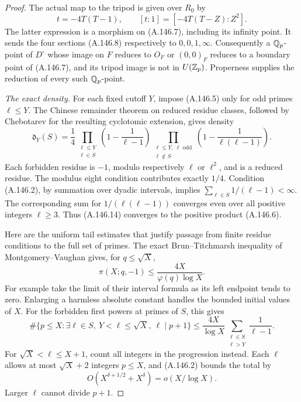 \begin{proof}
The actual map to the tripod is given over \(R_0\) by
\[
          t=-4T(T-1),\qquad
          [t:1]=[-4T(T-Z):Z^2].
\tag{A.146.13}
\]
The latter expression is a morphism on (A.146.7), including
its infinity point.  It sends the four sections (A.146.8)
respectively to \(0,0,1,\infty\).
Consequently a \(\mathbb Q_p\)-point of \(D^\circ\) whose image
on \(F\) reduces to \(O_F\) or \((0,0)_F\) reduces to a
boundary point of (A.146.7), and its tripod image is not in
\(U(\mathbb Z_p)\).  Properness supplies the reduction of every
such \(\mathbb Q_p\)-point.

\emph{The exact density.}
For each fixed cutoff \(Y\), impose (A.146.5) only for
odd primes \(\ell\le Y\).
The Chinese remainder theorem on reduced residue classes,
followed by Chebotarev for the resulting cyclotomic extension,
gives density
\[
 \mathfrak d_Y(S)=\frac14
       \prod_{\substack{\ell\le Y\\\ell\in S}}
                 \left(1-\frac1{\ell-1}\right)
       \prod_{\substack{\ell\le Y,\ \ell\text{ odd}\\\ell\notin S}}
                 \left(1-\frac1{\ell(\ell-1)}\right).
\tag{A.146.14}
\]
Each forbidden residue is \(-1\), modulo respectively
\(\ell\) or \(\ell^2\), and is a reduced residue.
The modulus eight condition contributes exactly \(1/4\).
Condition (A.146.2), by summation over dyadic intervals, implies
\(\sum_{\ell\in S}1/(\ell-1)<\infty\).
The corresponding sum for \(1/(\ell(\ell-1))\) converges
even over all positive integers \(\ell\ge3\).
Thus (A.146.14) converges to the positive product
(A.146.6).

Here are the uniform tail estimates that justify passage from
finite residue conditions to the full set of primes.
The exact Brun--Titchmarsh inequality of
Montgomery--Vaughan \cite[Theorem 2, (1.10), p.121]{LegMontgomeryVaughan1973}
gives, for \(q\le\sqrt X\),
\[
              \pi(X;q,-1)\le
                   \frac{4X}{\varphi(q)\log X}.
\tag{A.146.15}
\]
For example take the limit of their interval formula as its
left endpoint tends to zero.  Enlarging a harmless absolute
constant handles the bounded initial values of \(X\).
For the forbidden first powers at primes of \(S\), this gives
\[
 \#\{p\le X:\exists\ell\in S,\ Y<\ell\le\sqrt X,
                         \ \ell\mid p+1\}
 \le\frac{4X}{\log X}
                     \sum_{\substack{\ell\in S\\\ell>Y}}
                                 \frac1{\ell-1}.
\tag{A.146.16}
\]
For \(\sqrt X<\ell\le X+1\), count all integers in the
progression instead.  Each \(\ell\) allows at most
\(\sqrt X+2\) integers \(p\le X\), and (A.146.2)
bounds the total by
\[
                           O(X^{\delta+1/2}+X^\delta)
                                    =o(X/\log X).
\tag{A.146.17}
\]
Larger \(\ell\) cannot divide \(p+1\).


\end{proof}
